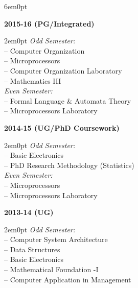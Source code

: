 \documentclass[11pt,a4paper]{moderncv}
\begin{document}
\begin{adjustwidth}{6em}{0pt}
	
	\textbf{2015-16 (PG/Integrated)}
	
	\begin{adjustwidth}{2em}{0pt}
		\textit{Odd Semester:} \\
		\hspace*{1.5em}-- Computer Organization \\
		\hspace*{1.5em}-- Microprocessors \\
		\hspace*{1.5em}-- Computer Organization Laboratory \\
		\hspace*{1.5em}-- Mathematics III \\
		
		\textit{Even Semester:} \\
		\hspace*{1.5em}-- Formal Language \& Automata Theory \\
		\hspace*{1.5em}-- Microprocessors Laboratory \\
	\end{adjustwidth}
	
	
	\textbf{2014-15 (UG/PhD Coursework)}
	
	\begin{adjustwidth}{2em}{0pt}
		\textit{Odd Semester:} \\
		\hspace*{1.5em}-- Basic Electronics \\
		\hspace*{1.5em}-- PhD Research Methodology (Statistics) \\
		
		\textit{Even Semester:} \\
		\hspace*{1.5em}-- Microprocessors \\
		\hspace*{1.5em}-- Microprocessors Laboratory \\
	\end{adjustwidth}
	
	
	\textbf{2013-14 (UG)}
	
	\begin{adjustwidth}{2em}{0pt}
		\textit{Odd Semester:} \\
		\hspace*{1.5em}-- Computer System Architecture \\
		\hspace*{1.5em}-- Data Structures \\
		\hspace*{1.5em}-- Basic Electronics \\
		\hspace*{1.5em}-- Mathematical Foundation -I \\
		\hspace*{1.5em}-- Computer Application in Management \\
		

\end{adjustwidth}
\end{adjustwidth}
\end{document}
